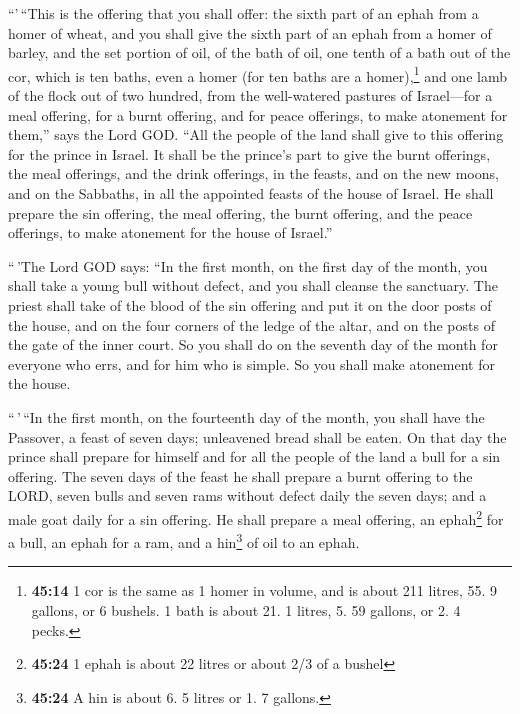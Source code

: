  ``'\,``This is the offering that you shall offer: the
sixth part of an ephah from a homer of wheat, and you shall give the
sixth part of an ephah from a homer of barley,  and the
set portion of oil, of the bath of oil, one tenth of a bath out of the
cor, which is ten baths, even a homer (for ten baths are a
homer),\footnote{\textbf{45:14} 1 cor is the same as 1 homer in volume,
  and is about 211 litres, 55. 9 gallons, or 6 bushels. 1 bath is about
  21. 1 litres, 5. 59 gallons, or 2. 4 pecks.}  and one
lamb of the flock out of two hundred, from the well-watered pastures of
Israel---for a meal offering, for a burnt offering, and for peace
offerings, to make atonement for them,'' says the Lord GOD.
 ``All the people of the land shall give to this offering
for the prince in Israel.  It shall be the prince's part
to give the burnt offerings, the meal offerings, and the drink
offerings, in the feasts, and on the new moons, and on the Sabbaths, in
all the appointed feasts of the house of Israel. He shall prepare the
sin offering, the meal offering, the burnt offering, and the peace
offerings, to make atonement for the house of Israel.''

 ``\,'The Lord GOD says: ``In the first month, on the
first day of the month, you shall take a young bull without defect, and
you shall cleanse the sanctuary.  The priest shall take
of the blood of the sin offering and put it on the door posts of the
house, and on the four corners of the ledge of the altar, and on the
posts of the gate of the inner court.  So you shall do on
the seventh day of the month for everyone who errs, and for him who is
simple. So you shall make atonement for the house.

 ``\,'\,``In the first month, on the fourteenth day of
the month, you shall have the Passover, a feast of seven days;
unleavened bread shall be eaten.  On that day the prince
shall prepare for himself and for all the people of the land a bull for
a sin offering.  The seven days of the feast he shall
prepare a burnt offering to the LORD, seven bulls and seven rams without
defect daily the seven days; and a male goat daily for a sin offering.
 He shall prepare a meal offering, an ephah\footnote{\textbf{45:24}
  1 ephah is about 22 litres or about 2/3 of a bushel} for a bull, an
ephah for a ram, and a hin\footnote{\textbf{45:24} A hin is about 6. 5
  litres or 1. 7 gallons.} of oil to an ephah.

